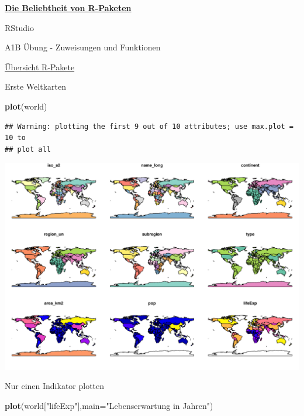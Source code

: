 \documentclass[ignorenonframetext,]{beamer}
\newenvironment{Shaded}{\begin{snugshade}}{\end{snugshade}}
\newcommand{\KeywordTok}[1]{\textcolor[rgb]{0.13,0.29,0.53}{\textbf{#1}}}
\newcommand{\DataTypeTok}[1]{\textcolor[rgb]{0.13,0.29,0.53}{#1}}
\newcommand{\StringTok}[1]{\textcolor[rgb]{0.31,0.60,0.02}{#1}}
\newcommand{\NormalTok}[1]{#1}
\newcommand{\DataTypeTok}[1]{\textcolor[rgb]{0.13,0.29,0.53}{#1}}
\newcommand{\KeywordTok}[1]{\textcolor[rgb]{0.13,0.29,0.53}{\textbf{#1}}}
\newcommand{\NormalTok}[1]{#1}
\newcommand{\StringTok}[1]{\textcolor[rgb]{0.31,0.60,0.02}{#1}}
\begin{document}
\begin{frame}{\href{https://gallery.shinyapps.io/cran-gauge/}{\textbf{Die
Beliebtheit von R-Paketen}}}
\begin{frame}{RStudio}
\begin{frame}[fragile]{A1B Übung - Zuweisungen und Funktionen}
\begin{frame}{\href{https://www.youtube.com/watch?v=kKI9--Opmso}{Übersicht
R-Pakete}}
\begin{frame}[fragile]{Erste Weltkarten}
\begin{Shaded}
\begin{Highlighting}[]
\KeywordTok{plot}\NormalTok{(world)}
\end{Highlighting}
\end{Shaded}

\begin{verbatim}
## Warning: plotting the first 9 out of 10 attributes; use max.plot = 10 to
## plot all
\end{verbatim}

\includegraphics{A1_HalloWelt_files/figure-beamer/unnamed-chunk-19-1.pdf}

\end{frame}

\begin{frame}[fragile]{Nur einen Indikator plotten}

\begin{Shaded}
\begin{Highlighting}[]
\KeywordTok{plot}\NormalTok{(world[}\StringTok{"lifeExp"}\NormalTok{],}\DataTypeTok{main=}\StringTok{"Lebenserwartung in Jahren"}\NormalTok{)}
\end{Highlighting}
\end{Shaded}


\end{frame}
\end{frame}
\end{frame}
\end{frame}
\end{frame}
\end{document}
